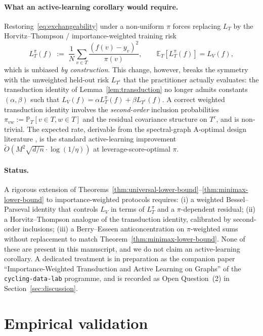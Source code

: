 \documentclass[11pt,a4paper]{article}
\theoremstyle{plain}
\theoremstyle{definition}
\theoremstyle{remark}
\newcommand{\E}{\mathbb{E}}
\newcommand{\PR}{\mathbb{P}}
\begin{document}
\paragraph{What an active-learning corollary would require.}
Restoring~\eqref{eq:exchangeability} under a non-uniform $\pi$ forces
replacing $L_T$ by the Horvitz--Thompson / importance-weighted
training risk
\begin{equation}
    L_T^\pi(f) \;:=\; \frac{1}{N}\sum_{v \in T}\frac{(f(v) - y_v)^2}{\pi(v)},
    \qquad \E_T[L_T^\pi(f)] = L_V(f),
    \label{eq:hto-risk}
\end{equation}
which is unbiased \emph{by construction}. This change, however,
breaks the symmetry with the unweighted held-out risk $L_{T^c}$ that
the practitioner actually evaluates: the transduction identity of
Lemma~\ref{lem:transduction} no longer admits constants
$(\alpha, \beta)$ such that
$L_V(f) = \alpha L_T^\pi(f) + \beta L_{T^c}(f)$.
A correct weighted transduction identity involves the
\emph{second-order} inclusion probabilities
$\pi_{vw} := \PR_T[v \in T, w \in T]$ and the residual
covariance structure on $T^c$, and is non-trivial. The expected
rate, derivable from the spectral-graph A-optimal design literature
\citep{DrineasMahoney2018,Avron2017,Puy2018}, is the standard
active-learning improvement $\widetilde O(M^2 \sqrt{d/n} \cdot
\log(1/\eta))$ at leverage-score-optimal $\pi$.

\paragraph{Status.}
A rigorous extension of Theorems~\ref{thm:universal-lower-bound}--\ref{thm:minimax-lower-bound}
to importance-weighted protocols requires: (i) a weighted
Bessel--Parseval identity that controls $L_V$ in terms of
$L_T^\pi$ and a $\pi$-dependent residual; (ii) a Horvitz--Thompson
analogue of the transduction identity, calibrated by second-order
inclusions; (iii) a Berry--Esseen anticoncentration on
$\pi$-weighted sums without replacement to match
Theorem~\ref{thm:minimax-lower-bound}. None of these are present in
this manuscript, and we do not claim an active-learning corollary.
A dedicated treatment is in preparation as the companion paper
``Importance-Weighted Transduction and Active Learning on Graphs''
of the \texttt{cycling-data-lab} programme, and is recorded as Open
Question~(2) in Section~\ref{sec:discussion}.

\section{Empirical validation}
\label{sec:empirics}
\end{document}
